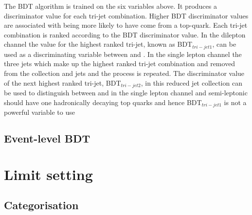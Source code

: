 The BDT algorithm is trained on the six variables above. It produces a discriminator value for each tri-jet combination. Higher BDT discriminator values are associated with being more likely to have come from a top-quark. Each tri-jet combination is ranked according to the BDT discriminator value. In the dilepton channel the value for the highest ranked tri-jet, known as BDT$_{tri-jet1}$, can be used as a discriminating variable between \tttt and \ttbar. In the single lepton channel the three jets which make up the highest ranked tri-jet combination and removed from the collection and jets and the process is repeated. The discriminator value of the next highest ranked tri-jet, BDT$_{tri-jet2}$, in this reduced jet collection can be used to distinguish between \tttt and \ttbar in the single lepton channel and semi-leptonic \ttbar should have one hadronically decaying top quarks and hence BDT$_{tri-jet1}$ is not a powerful variable to use
 
\subsection{Event-level BDT}

\section{Limit setting}

\subsection{Categorisation}
\label{sec:Cats}




